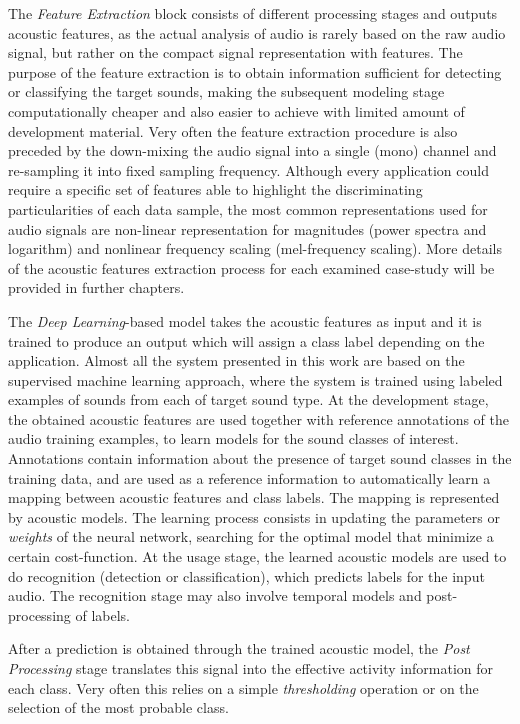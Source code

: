 The \textit{Feature Extraction} block consists
of different processing stages and outputs acoustic features, as the actual analysis of
audio is rarely based on the raw audio signal, but rather on the compact signal
representation with features. The purpose of the feature extraction is to obtain
information sufficient for detecting or classifying the target sounds, making the
subsequent modeling stage computationally cheaper and also easier to achieve with
limited amount of development material. Very often the feature extraction procedure is also preceded by the down-mixing the audio signal into a single (mono) channel and re-sampling it into fixed sampling frequency.
Although every application could require a specific set of features able to highlight the discriminating particularities of each data sample, the most common representations used
for audio signals are non-linear representation for magnitudes (power spectra and logarithm) and nonlinear frequency scaling (mel-frequency scaling). 
More details of the acoustic features extraction process for each examined case-study will be provided in further chapters.


The \textit{Deep Learning}-based model takes the acoustic features as input and it is trained to produce an output which will assign a class label depending on the application. Almost all the system presented in this work are based on the supervised machine learning approach, where the system is trained using labeled examples of sounds from each of target sound type. 
At the development stage, the obtained acoustic features are used together with
reference annotations of the audio training examples, to learn models for the
sound classes of interest. Annotations contain information about the presence of
target sound classes in the training data, and are used as a reference information
to automatically learn a mapping between acoustic features and class labels. The
mapping is represented by acoustic models. The learning process consists in updating the parameters or \textit{weights} of the neural network, searching for the optimal model that minimize a certain cost-function. 
At the usage stage, the learned acoustic models are used to do recognition (detection or classification), which predicts labels
for the input audio. The recognition stage may also involve temporal models and
post-processing of labels.


After a prediction is obtained through the trained acoustic model, the \textit{Post Processing} stage translates this signal into the effective activity information for each class. Very often this relies on a simple \textit{thresholding} operation or on the selection of the most probable class.


